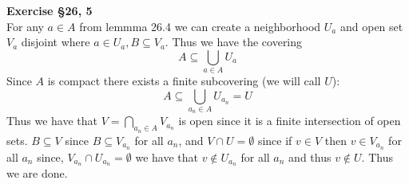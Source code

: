 \documentclass[12pt]{article}
\newenvironment{ques}[1]{\textbf{Exercise #1}\vspace{1 mm}\\ }{\bigskip}
\theoremstyle{definition}
\begin{document}
\begin{ques}{\S 26, 5}
	For any $a \in A$ from lemmma 26.4 we can create a neighborhood $U_a$ and
	open set $V_a$ disjoint where $a \in U_a, B \subseteq V_a$. Thus we have the covering
	$$A \subseteq \bigcup_{a \in A} U_a$$
	Since $A$ is compact there exists a finite subcovering (we will call $U$):
	$$A \subseteq \bigcup_{a_n \in A} U_{a_n} = U$$
	Thus we have that $V = \bigcap_{a_n \in A} V_{a_n}$ is open since it is a
	finite intersection of open sets. $B \subseteq V$ since $B \subseteq
	V_{a_n}$ for all $a_n$, and $V \cap U = \emptyset$ since if $v \in V$ then
	$v \in V_{a_n}$ for all $a_n$ since, $V_{a_n} \cap U_{a_n} = \emptyset$ we
	have that $v \notin U_{a_n}$ for all $a_n$ and thus $v \notin U$. Thus we
	are done.
	
\end{ques}
\end{document}
